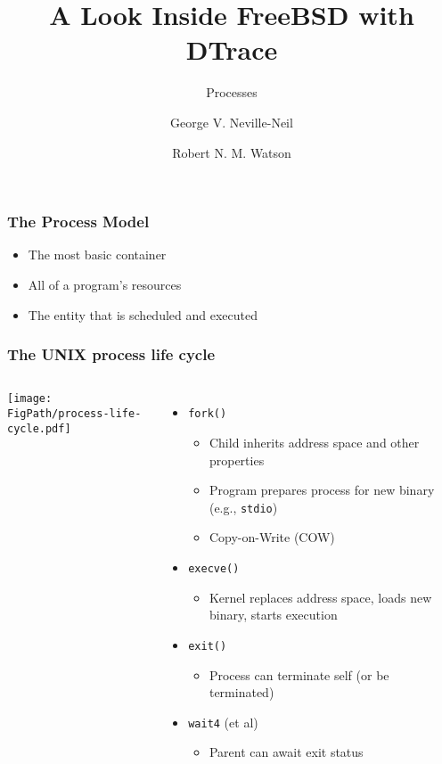 \documentclass[pdftex]{beamer}
\begin{document}

\title{A Look Inside FreeBSD with DTrace}
\subtitle{Processes}
\author[shortname]{George V. Neville-Neil \and Robert N. M. Watson}

\begin{frame}
  \titlepage
\end{frame}

\begin{frame}
  \frametitle{The Process Model}
  \begin{itemize}
  \item The most basic container
  \item All of a program's resources
  \item The entity that is scheduled and executed
  \end{itemize}
\end{frame}

\begin{frame}[fragile]
  \frametitle{The UNIX process life cycle}

  \begin{columns}[T]
      \vspace{0.5cm}
      \texttt{[image: \\FigPath/process-life-cycle.pdf]}

    \begin{itemize}
      \item \texttt{fork()}
      \begin{itemize}
	\item Child inherits address space and other properties
	\item Program prepares process for new binary (e.g., \texttt{stdio})
	\item Copy-on-Write (COW)
      \end{itemize}
      \pause
      \item \texttt{execve()}
      \begin{itemize}
	\item Kernel replaces address space, loads new binary, starts execution
      \end{itemize}
      \pause
      \item \texttt{exit()}
      \begin{itemize}
	\item Process can terminate self (or be terminated)
      \end{itemize}
      \pause
      \item \texttt{wait4} (et al)
      \begin{itemize}
	\item Parent can await exit status
      \end{itemize}
    \end{itemize}
  \end{columns}
\end{frame}
\end{document}
